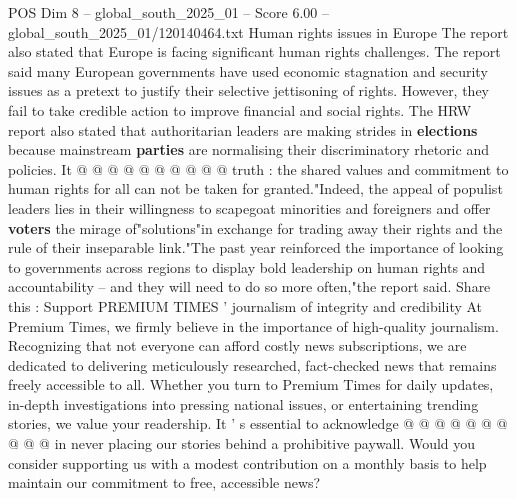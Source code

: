 \begin{textsample}{POS Dim 8 – global\_south\_2025\_01 – Score 6.00 – global\_south\_2025\_01/120140464.txt}
Human rights issues in Europe The report also stated that Europe is facing significant human rights challenges.
The report said many European governments have used economic stagnation and security issues as a pretext to justify their selective jettisoning of rights.
However, they fail to take credible action to improve financial and social rights.
The HRW report also stated that authoritarian leaders are making strides in \textbf{elections} because mainstream \textbf{parties} are normalising their discriminatory rhetoric and policies.
It @ @ @ @ @ @ @ @ @ @ truth : the shared values and commitment to human rights for all can not be taken for granted."Indeed, the appeal of populist leaders lies in their willingness to scapegoat minorities and foreigners and offer \textbf{voters} the mirage of"solutions"in exchange for trading away their rights and the rule of their inseparable link."The past year reinforced the importance of looking to governments across regions to display bold leadership on human rights and accountability -- and they will need to do so more often,"the report said.
Share this : Support PREMIUM TIMES ' journalism of integrity and credibility At Premium Times, we firmly believe in the importance of high-quality journalism.
Recognizing that not everyone can afford costly news subscriptions, we are dedicated to delivering meticulously researched, fact-checked news that remains freely accessible to all.
Whether you turn to Premium Times for daily updates, in-depth investigations into pressing national issues, or entertaining trending stories, we value your readership.
It ' s essential to acknowledge @ @ @ @ @ @ @ @ @ @ in never placing our stories behind a prohibitive paywall.
Would you consider supporting us with a modest contribution on a monthly basis to help maintain our commitment to free, accessible news?

\end{textsample}
